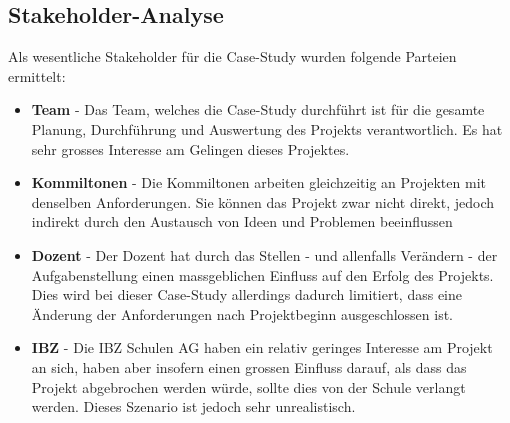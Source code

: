 \subsection{Stakeholder-Analyse}
Als wesentliche Stakeholder für die Case-Study wurden folgende Parteien ermittelt:

\begin{itemize}
  \item \textbf{Team} - Das Team, welches die Case-Study durchführt ist für die gesamte Planung, Durchführung und Auswertung des Projekts verantwortlich. Es hat sehr grosses Interesse am Gelingen dieses Projektes.
  \item \textbf{Kommiltonen} - Die Kommiltonen arbeiten gleichzeitig an Projekten mit denselben Anforderungen. Sie können das Projekt zwar nicht direkt, jedoch indirekt durch den Austausch von Ideen und Problemen beeinflussen
  \item \textbf{Dozent} - Der Dozent hat durch das Stellen - und allenfalls Verändern - der Aufgabenstellung einen massgeblichen Einfluss auf den Erfolg des Projekts. Dies wird bei dieser Case-Study allerdings dadurch limitiert, dass eine Änderung der Anforderungen nach Projektbeginn ausgeschlossen ist.
  \item \textbf{IBZ} - Die IBZ Schulen AG haben ein relativ geringes Interesse am Projekt an sich, haben aber insofern einen grossen Einfluss darauf, als dass das Projekt abgebrochen werden würde, sollte dies von der Schule verlangt werden. Dieses Szenario ist jedoch sehr unrealistisch.
\end{itemize}

\vspace{5mm}

